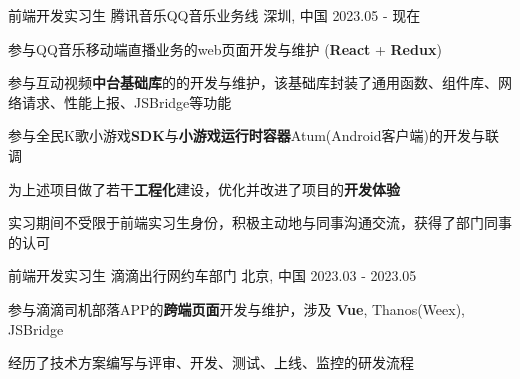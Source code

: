 

\begin{cventries}
    \cventry
    {前端开发实习生} %
    {腾讯音乐\hspace{2mm}QQ音乐业务线} %
    {深圳, 中国} %
    {2023.05 - 现在} %
    {
        \begin{cvitems} %
            \item {参与QQ音乐移动端直播业务的web页面开发与维护 (\textbf{React} + \textbf{Redux})}
            \item {参与互动视频\textbf{中台基础库}的的开发与维护，该基础库封装了通用函数、组件库、网络请求、性能上报、JSBridge等功能}
            \item {参与全民K歌小游戏\textbf{SDK}与\textbf{小游戏运行时容器}Atum(Android客户端)的开发与联调}
            \item {为上述项目做了若干\textbf{工程化}建设，优化并改进了项目的\textbf{开发体验}}
            \item {实习期间不受限于前端实习生身份，积极主动地与同事沟通交流，获得了部门同事的认可}
        \end{cvitems}
    }

    \cventry
    {前端开发实习生} %
    {滴滴出行\hspace{2mm}网约车部门} %
    {北京, 中国} %
    {2023.03 - 2023.05} %
    {
        \begin{cvitems} %
            \item {参与滴滴司机部落APP的\textbf{跨端页面}开发与维护，涉及 \textbf{Vue}, Thanos(Weex), JSBridge }
            \item {经历了技术方案编写与评审、开发、测试、上线、监控的研发流程}
        \end{cvitems}
    }
\end{cventries}
